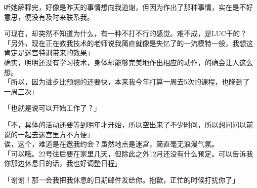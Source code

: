 听她解释完，好像是昨天的事情想向我道谢，但因为作出了那种事情，实在是不好意思，便没有及时来联系我。

可现在，却突然不知道为什么，有一种不打不行的感觉。难不成，是LUC干的？\\

「另外，现在正在教我技术的老师说我简直就像是失忆了的一流模特一般，我想这肯定是迷宫特训带来的效果」\\

确实，明明还没有学习技术，身体却能够完美地作出相应的动作，的确会让人这么想。\\

「所以，因为进步比预想的还要快，本来我今年打算一周去5次的课程，也降到了一周三次」

「也就是说可以开始工作了？」

「不，具体的活动还要等到明年才开始，所以空出来了不少时间，所以想问问以前说的一起去迷宫里方不方便」\\

诶，这个，难道是在邀我约会？虽然地点是迷宫，简直毫无浪漫气氛。\\

「可以哦。22号往后要在家里几天，但除此之外12月还没有什么预定。可以告诉我你那边休息日的话，我也好调整日程」

「谢谢！那一会我把我休息的日期邮件发给你。抱歉，正忙的时候打扰你了」

